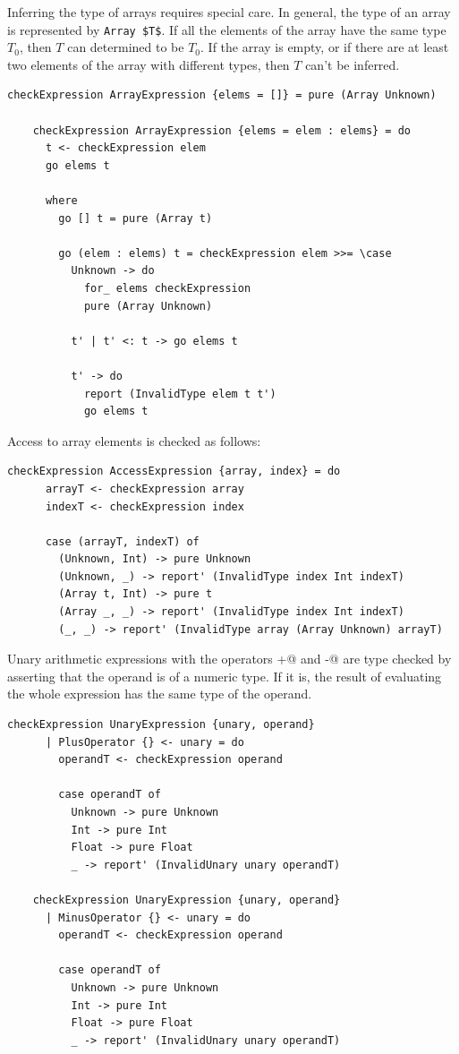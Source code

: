 \documentclass[UdineBachThesis,american,11pt]{PhdThesis}
\begin{document}
  Inferring the type of arrays requires special care. In general, the type of an
  array is represented by \lstinline[mathescape]@Array $T$@. If all the elements
  of the array have the same type $T_0$, then $T$ can determined to be $T_0$. If
  the array is empty, or if there are at least two elements of the array with
  different types, then $T$ can't be inferred.

  \begin{lstlisting}[gobble=4,basicstyle=\ttfamily\small]
    checkExpression ArrayExpression {elems = []} = pure (Array Unknown)

    checkExpression ArrayExpression {elems = elem : elems} = do
      t <- checkExpression elem
      go elems t

      where
        go [] t = pure (Array t)

        go (elem : elems) t = checkExpression elem >>= \case
          Unknown -> do
            for_ elems checkExpression
            pure (Array Unknown)

          t' | t' <: t -> go elems t

          t' -> do
            report (InvalidType elem t t')
            go elems t
  \end{lstlisting}

  Access to array elements is checked as follows:

  \begin{lstlisting}[gobble=4,basicstyle=\ttfamily\small]
    checkExpression AccessExpression {array, index} = do
      arrayT <- checkExpression array
      indexT <- checkExpression index

      case (arrayT, indexT) of
        (Unknown, Int) -> pure Unknown
        (Unknown, _) -> report' (InvalidType index Int indexT)
        (Array t, Int) -> pure t
        (Array _, _) -> report' (InvalidType index Int indexT)
        (_, _) -> report' (InvalidType array (Array Unknown) arrayT)
  \end{lstlisting}

  Unary arithmetic expressions with the operators \lstinline@+@ and
  \lstinline@-@ are type checked by asserting that the operand is of a numeric
  type. If it is, the result of evaluating the whole expression has the same
  type of the operand.

  \begin{lstlisting}[gobble=4,basicstyle=\ttfamily\small]
    checkExpression UnaryExpression {unary, operand}
      | PlusOperator {} <- unary = do
        operandT <- checkExpression operand

        case operandT of
          Unknown -> pure Unknown
          Int -> pure Int
          Float -> pure Float
          _ -> report' (InvalidUnary unary operandT)

    checkExpression UnaryExpression {unary, operand}
      | MinusOperator {} <- unary = do
        operandT <- checkExpression operand

        case operandT of
          Unknown -> pure Unknown
          Int -> pure Int
          Float -> pure Float
          _ -> report' (InvalidUnary unary operandT)
  \end{lstlisting}
\end{document}

